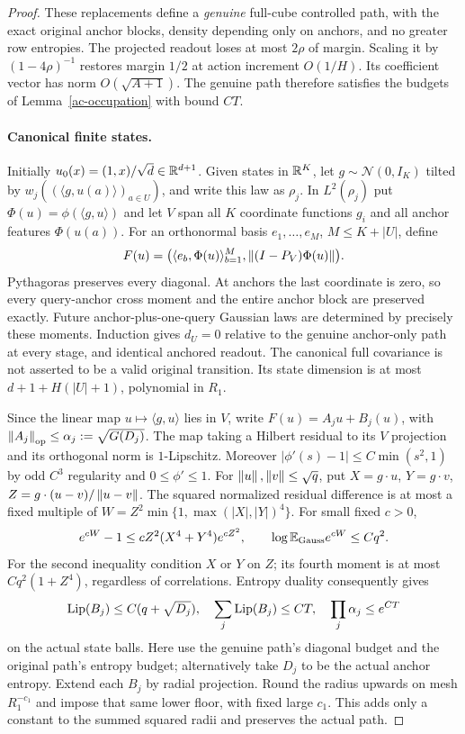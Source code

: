 \begin{proof}
These replacements define a \emph{genuine} full-cube controlled path,
with the exact original anchor blocks, density depending only on
anchors, and no greater row entropies. The projected readout loses
at most $2\rho$ of margin. Scaling it by $(1-4\rho)^{-1}$ restores
margin $1/2$ at action increment $O(1/H)$. Its coefficient vector
has norm $O(\sqrt{A+1})$. The genuine path therefore satisfies
the budgets of Lemma~\ref{ac-occupation} with bound $CT$.

\paragraph{Canonical finite states.}
Initially $u_0(x)=(1,x)/\sqrt d\in\mathbb R^{d+1}$. Given states in
$\mathbb R^K$, let $g\sim\mathcal N(0,I_K)$ tilted by
$w_j((\langle g,u(a)\rangle)_{a\in U})$, and write this law as
$\rho_j$. In $L^2(\rho_j)$ put
$\Phi(u)=\phi(\langle g,u\rangle)$ and let $V$ span all $K$
coordinate functions $g_i$ and all anchor features $\Phi(u(a))$.
For an orthonormal basis $e_1,\ldots,e_M$, $M\le K+|U|$, define
\begin{equation}\label{ac-canonical}
 F(u)=\bigl(\langle e_b,\Phi(u)\rangle_{b=1}^M,
                         \left\lVert(I-P_V)\Phi(u)\right\rVert\bigr).
\end{equation}
Pythagoras preserves every diagonal. At anchors the last coordinate
is zero, so every query-anchor cross moment and the entire anchor
block are preserved exactly. Future anchor-plus-one-query Gaussian
laws are determined by precisely these moments. Induction gives
$d_U=0$ relative to the genuine anchor-only path at every stage,
and identical anchored readout. The canonical full covariance is
not asserted to be a valid original transition. Its state dimension
is at most $d+1+H(|U|+1)$, polynomial in $R_1$.

Since the linear map $u\mapsto\langle g,u\rangle$ lies in $V$,
write $F(u)=A_ju+B_j(u)$, with
$\left\lVert A_j\right\rVert_{\rm op}\le\alpha_j:=\sqrt{G(D_j)}$.
The map taking a Hilbert residual to its $V$ projection and its
orthogonal norm is $1$-Lipschitz. Moreover
$|\phi'(s)-1|\le C\min(s^2,1)$ by odd $C^3$ regularity and
$0\le\phi'\le1$. For $\left\lVert u\right\rVert,\left\lVert v\right\rVert\le\sqrt q$, put
$X=g\cdot u$, $Y=g\cdot v$, $Z=g\cdot(u-v)/\left\lVert u-v\right\rVert$.
The squared normalized residual difference is at most a fixed
multiple of
$W=Z^2\min\{1,\max(|X|,|Y|)^4\}$.
For small fixed $c>0$,
\[
 e^{cW}-1\le cZ^2(X^4+Y^4)e^{cZ^2},\qquad
 \log\mathbb E_{\rm Gauss}e^{cW}\le Cq^2.
\]
For the second inequality condition $X$ or $Y$ on $Z$; its fourth
moment is at most $Cq^2(1+Z^4)$, regardless of correlations.
Entropy duality consequently gives
\begin{equation}\label{ac-residual-budget}
 \operatorname{Lip}(B_j)\le C(q+\sqrt{D_j}),\quad
 \sum_j\operatorname{Lip}(B_j)\le CT,\quad \prod_j\alpha_j\le e^{CT}
\end{equation}
on the actual state balls. Here use the genuine path's diagonal
budget and the original path's entropy budget; alternatively take
$D_j$ to be the actual anchor entropy. Extend each $B_j$ by radial
projection. Round the radius upwards on mesh $R_1^{-c_1}$ and impose
that same lower floor, with fixed large $c_1$. This adds only a
constant to the summed squared radii and preserves the actual path.


\end{proof}

